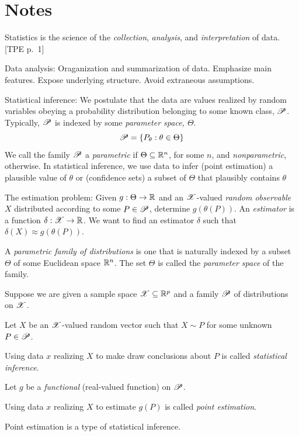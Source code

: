\documentclass[12pt]{amsart}
\begin{document}
\section{Notes}

Statistics is the science of the \emph{collection}, \emph{analysis}, and \emph{interpretation} of data. [TPE p.~1]

Data analysis: Oraganization and summarization of data.
Emphasize main features.
Expose underlying structure.
Avoid extraneous assumptions.

Statistical inference:
We postulate that the data are values realized by random variables obeying a probability distribution belonging to some known class, $\mathscr{P}$.
Typically, $\mathscr{P}$ is indexed by some \emph{parameter space, $\Theta$}.
\[
    \mathscr{P} = \{P_\theta : \theta\in\Theta\}
\]
We call the family $\mathscr{P}$ a \emph{parametric} if $\Theta\subseteq\mathbb{R}^n$, for some $n$, and \emph{nonparametric}, otherwise.
In statistical inference, we use data to infer (point estimation) a plausible value of $\theta$ or (confidence sets) a subset of $\Theta$ that plausibly contains $\theta$

The estimation problem: Given $g:\Theta\to \mathbb{R}$ and an $\mathscr{X}$-valued \emph{random observable} $X$ distributed according to some $P\in\mathscr{P}$, determine $g(\theta(P))$.
An \emph{estimator} is a function $\delta:\mathscr{X}\to\mathbb{R}$. We want to find an estimator $\delta$ such that $\delta(X)\approx g(\theta(P))$.

A \emph{parametric family of distributions} is one that is naturally indexed by a subset $\Theta$ of some Euclidean space $\mathbb{R}^n$.
The set $\Theta$ is called the \emph{parameter space} of the family. 

Suppose we are given a sample space $\mathscr{X}\subseteq\mathbb{R}^p$ and a family $\mathscr{P}$ of distributions on $\mathscr{X}$.

Let $X$ be an $\mathscr{X}$-valued random vector such that $X\sim P$ for some unknown $P\in\mathscr{P}$.

Using data $x$ realizing $X$ to make draw conclusions about $P$ is called \emph{statistical inference}.

Let $g$ be a \emph{functional} (real-valued function) on $\mathscr{P}$.

Using data $x$ realizing $X$ to estimate $g(P)$ is called \emph{point estimation}.

Point estimation is a type of statistical inference.
\end{document}
